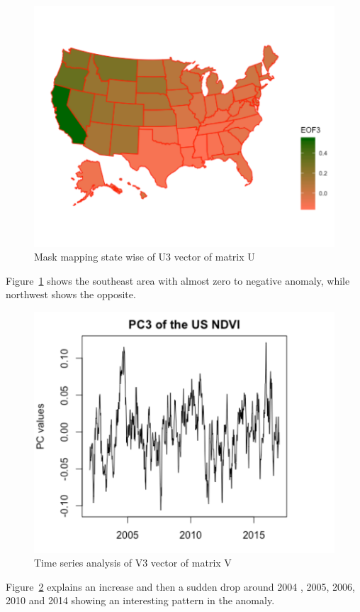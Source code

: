      \begin{figure}[H]
            \centering
            \includegraphics[width=0.70\linewidth]{figures/ch5/SVD/eof3.png}
            \caption{\label{fig:EOF_3} Mask mapping state wise of U3 vector of matrix U}
    \end{figure}
    
   Figure~\ref{fig:EOF_3} shows the southeast area with almost zero to negative anomaly, while northwest shows the opposite.
    
     \begin{figure}[H]
            \centering
            \includegraphics[width=0.70\linewidth]{figures/ch5/SVD/pc3.png}
            \caption{\label{fig:V_3} Time series analysis of V3 vector of matrix V}
    \end{figure}
    
    Figure~\ref{fig:V_3} explains an increase and then a sudden drop around 2004 , 2005, 2006, 2010 and 2014 showing an interesting pattern in the anomaly.
    

